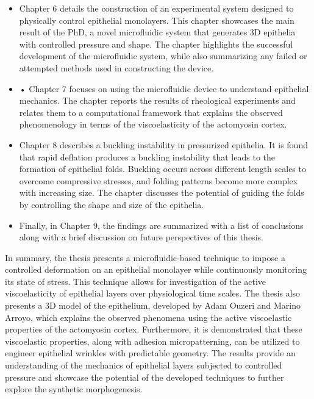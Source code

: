 \begin{itemize}
\item Chapter 6 details the construction of an experimental system designed to physically control epithelial monolayers. This chapter showcases the main result of the PhD, a novel microfluidic system that generates 3D epithelia with controlled pressure and shape. The chapter highlights the successful development of the microfluidic system, while also summarizing any failed or attempted methods used in constructing the device.  
\item •	Chapter 7 focuses on using the microfluidic device to understand epithelial mechanics. The chapter reports the results of rheological experiments and relates them to a computational framework that explains the observed phenomenology in terms of the viscoelasticity of the actomyosin cortex. 
\item Chapter 8 describes a buckling instability in pressurized epithelia. It is found that rapid deflation produces a buckling instability that leads to the formation of epithelial folds. Buckling occurs across different length scales to overcome compressive stresses, and folding patterns become more complex with increasing size. The chapter discusses the potential of guiding the folds by controlling the shape and size of the epithelia. 
\item Finally, in Chapter 9, the findings are summarized with a list of conclusions along with a brief discussion on future perspectives of this thesis.
\end{itemize}

In summary, the thesis presents a microfluidic-based technique to impose a controlled deformation on an epithelial monolayer while continuously monitoring its state of stress. This technique allows for investigation of the active viscoelasticity of epithelial layers over physiological time scales. The thesis also presents a 3D model of the epithelium, developed by Adam Ouzeri and Marino Arroyo, which explains the observed phenomena using the active viscoelastic properties of the actomyosin cortex. Furthermore, it is demonstrated that these viscoelastic properties, along with adhesion micropatterning, can be utilized to engineer epithelial wrinkles with predictable geometry. The results provide an understanding of the mechanics of epithelial layers subjected to controlled pressure and showcase the potential of the developed techniques to further explore the synthetic morphogenesis.
